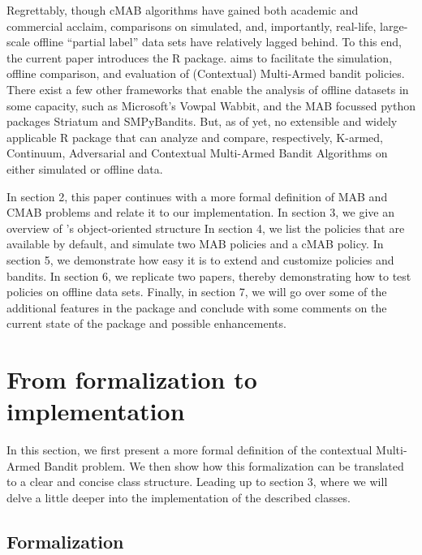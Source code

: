 \documentclass[nojss]{jss}\usepackage[]{graphicx}\usepackage[]{color}
\begin{document}
Regrettably, though cMAB algorithms have gained both academic and commercial acclaim, comparisons on simulated, and, importantly, real-life, large-scale offline \textquotedblleft{}partial label\textquotedblright{} data sets have relatively lagged behind. To this end, the current paper introduces the  R package.  aims to facilitate the simulation, offline comparison, and evaluation of (Contextual) Multi-Armed bandit policies. There exist a few other frameworks that enable the analysis of offline datasets in some capacity, such as Microsoft's Vowpal Wabbit, and the MAB focussed python packages Striatum and SMPyBandits. But, as of yet, no extensible and widely applicable R package that can analyze and compare, respectively, K-armed, Continuum, Adversarial and Contextual Multi-Armed Bandit Algorithms on either simulated or offline data.

In section 2, this paper continues with a more formal definition of MAB and CMAB problems and relate it to our implementation. In section 3, we give an overview of ’s object-oriented structure In section 4, we list the policies that are available by default, and simulate two MAB policies and a cMAB policy. In section 5, we demonstrate how easy it is to extend and customize  policies and bandits. In section 6, we replicate two papers, thereby demonstrating how to test policies on offline data sets. Finally, in section  7, we will go over some of the additional features in the package and conclude with some comments on the current state of the package and possible enhancements.

\section{From formalization to implementation}


In this section, we first present a more formal definition of the contextual Multi-Armed Bandit problem. We then show how this formalization can be translated to a clear and concise class structure. Leading up to section 3, where we will delve a little deeper into the implementation of the described classes.

\subsection{Formalization}
\end{document}

